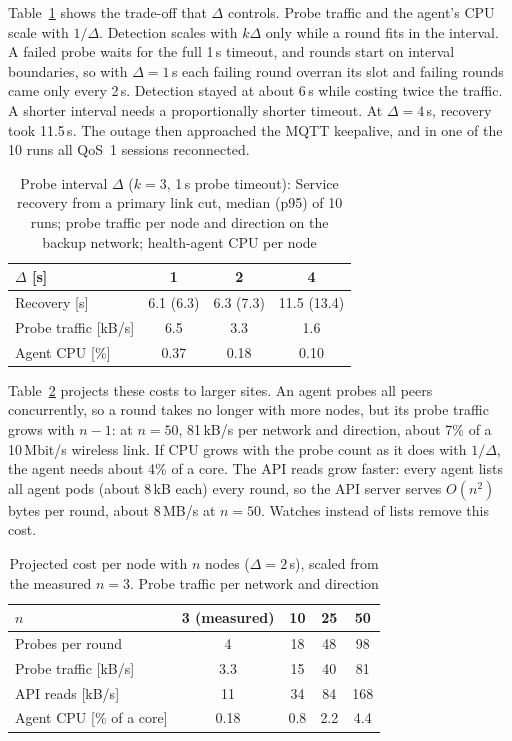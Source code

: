 \documentclass[conference,compsoc]{IEEEtran}
\begin{document}
Table~\ref{tab:delta} shows the trade-off that $\Delta$ controls. Probe traffic and
the agent's CPU scale with $1/\Delta$. Detection scales with $k\Delta$ only while a
round fits in the interval. A failed probe waits for the full 1\,s timeout, and
rounds start on interval boundaries, so with $\Delta=1$\,s each failing round
overran its slot and failing rounds came only every 2\,s. Detection stayed at about
6\,s while costing twice the traffic. A shorter interval needs a proportionally
shorter timeout. At $\Delta=4$\,s, recovery took 11.5\,s. The outage then approached
the MQTT keepalive, and in one of the 10 runs all QoS~1 sessions reconnected.

\begin{table}[t]
\centering
\caption{Probe interval $\Delta$ ($k=3$, 1\,s probe timeout): Service recovery from a
primary link cut, median (p95) of 10 runs; probe traffic per node and direction on
the backup network; health-agent CPU per node}
\label{tab:delta}
\footnotesize
\begin{tabular}{@{}lccc@{}}
\toprule
$\Delta$ [s] & 1 & 2 & 4 \\
\midrule
Recovery [s]          & 6.1 (6.3) & 6.3 (7.3) & 11.5 (13.4) \\
Probe traffic [kB/s]  & 6.5 & 3.3 & 1.6 \\
Agent CPU [\%]        & 0.37 & 0.18 & 0.10 \\
\bottomrule
\end{tabular}
\end{table}

Table~\ref{tab:scale} projects these costs to larger sites. An agent probes all peers
concurrently, so a round takes no longer with more nodes, but its probe traffic grows
with $n-1$: at $n=50$, 81\,kB/s per network and direction, about 7\% of a 10\,Mbit/s
wireless link. If CPU grows with the probe count as it does with $1/\Delta$, the agent
needs about 4\% of a core. The API reads grow faster: every agent lists all agent pods
(about 8\,kB each) every round, so the API server serves $O(n^2)$ bytes per round,
about 8\,MB/s at $n=50$. Watches instead of lists remove this cost.

\begin{table}[t]
\centering
\caption{Projected cost per node with $n$ nodes ($\Delta=2$\,s), scaled from the
measured $n=3$. Probe traffic per network and direction}
\label{tab:scale}
\footnotesize
\begin{tabular}{@{}lcccc@{}}
\toprule
$n$ & 3 (measured) & 10 & 25 & 50 \\
\midrule
Probes per round           & 4    & 18  & 48  & 98  \\
Probe traffic [kB/s]       & 3.3  & 15  & 40  & 81  \\
API reads [kB/s]           & 11   & 34  & 84  & 168 \\
Agent CPU [\% of a core]   & 0.18 & 0.8 & 2.2 & 4.4 \\
\bottomrule
\end{tabular}
\end{table}
\end{document}
